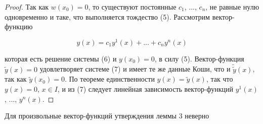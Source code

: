 \begin{proof}
Так как $w(x_0)=0$, то существуют постоянные $c_1$, ..., $c_n$, не равные нулю одновременно и таке, что выполняется тождество (5). Рассмотрим вектор-функцию

\begin{equation}
    y(x) = c_1y^1(x) + ... + c_ny^n(x)
\end{equation}

которая есть решение системы (6) и $y(x_0) = 0$, в силу (5). Вектор-функция $\tilde y(x) = 0$ удовлетворяет системе (7) и имеет те же данные Коши, что и $\tilde \tilde y(x)$, так как $\tilde y(x_0) = 0$. По теореме единственности $y(x)=\tilde y(x)$, так что $y(x) = 0$, $x \in I$, и из (7) следует линейная зависимость вектор-функций $y^1(x)$, ..., $y^n(x)$.
\end{proof}

\begin{theorem}
Для произвольные вектор-функций утверждения леммы 3 неверно
\end{theorem}